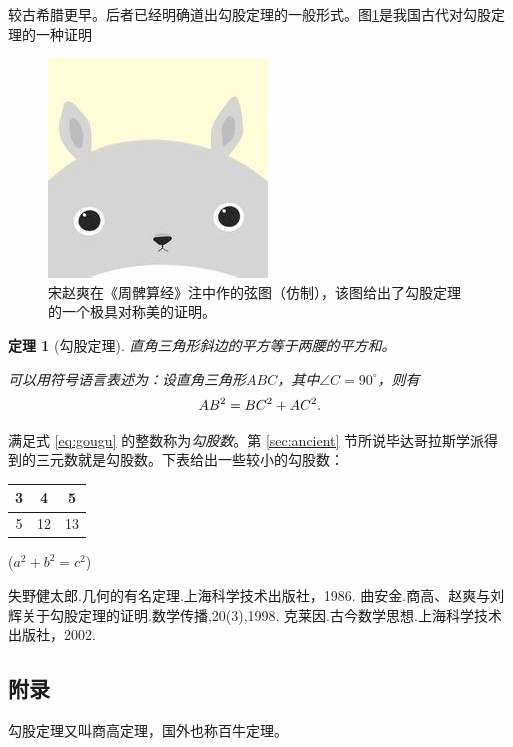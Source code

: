 \documentclass[UTF8]{ctexart}  %
\newtheorem{thm}{定理}  %
\newcommand\degree{^\circ}    %
\begin{document}
\small 较古希腊更早。后者已经明确道出勾股定理的一般形式。图\ref{fig:xiantu}是我国古代对勾股定理的一种证明\cite{quanjing}   %
\begin{figure}[!ht]\centering   %
\includegraphics[scale=0.5]{xiantu.jpg}    %
\caption{宋赵爽在《周髀算经》注中作的弦图（仿制），该图给出了勾股定理的一个极具对称美的证明。\label{fig:xiantu}}  %
\end{figure}



\begin{thm}[\small{勾股定理}]  %
\small{直角三角形斜边的平方等于两腰的平方和。}

\small {可以用符号语言表述为：设直角三角形$ABC$，其中$\angle C=90\degree$，则有}   %
\begin{equation}\label{eq:gougu}   %
\small AB^2=BC^2+AC^2.
\end{equation}
\end{thm}
\small 满足式 \eqref{eq:gougu} 的整数称为\emph{勾股数}。第 \ref{sec:ancient} 节所说毕达哥拉斯学派得到的三元数就是勾股数。下表给出一些较小的勾股数：%

\vspace{3mm}    %
\begin{tabular}{|c|c|c|}\hline   %
\small{}     %
3&4&5\\\hline
5&12&13\\\hline
\end{tabular}
\small($a^2+b^2=c^2$)

\begin{thebibliography}{99}    %
失野健太郎.几何的有名定理.上海科学技术出版社，1986.                    %
曲安金.商高、赵爽与刘辉关于勾股定理的证明.数学传播,20(3),1998.                  %
克莱因.古今数学思想.上海科学技术出版社，2002.
\end{thebibliography}
\begin{appendix}               %
\section{附录}
\small {勾股定理又叫商高定理，国外也称百牛定理。}
\end{appendix}
\end{document}
